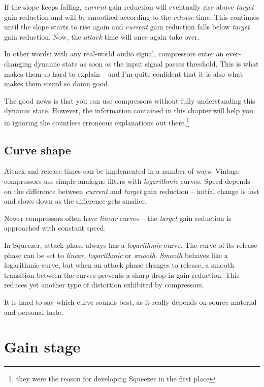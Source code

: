If the slope keeps falling, \emph{current} gain reduction will
eventually rise above \emph{target} gain reduction and will be
smoothed according to the \emph{release} time.  This continues until
the slope starts to rise again and \emph{current} gain reduction falls
below \emph{target} gain reduction.  Now, the \emph{attack} time will
once again take over.

In other words: with any real-world audio signal, compressors enter an
ever-changing dynamic state as soon as the input signal passes
threshold.  This is what makes them so hard to explain -- and I'm
quite confident that it is also what makes them sound so damn good.

The good news is that you can use compressors without fully
understanding this dynamic state.  However, the information contained
in this chapter will help you in ignoring the countless erroneous
explanations out there.\footnote{they were the reason for developing
  Squeezer in the first place}

\subsection{Curve shape}
\label{sec:curve_shape}

Attack and release times can be implemented in a number of ways.
Vintage compressors use simple analogue filters with
\emph{logarithmic} curves.  Speed depends on the difference between
\emph{current} and \emph{target} gain reduction -- initial change is
fast and slows down as the difference gets smaller.

Newer compressors often have \emph{linear} curves -- the \emph{target}
gain reduction is approached with constant speed.

In Squeezer, attack phase always has a \emph{logarithmic} curve.  The
curve of its release phase can be set to \emph{linear},
\emph{logarithmic} or \emph{smooth}.  \emph{Smooth} behaves like a
logarithmic curve, but when an attack phase changes to release, a
smooth transition between the curves prevents a sharp drop in gain
reduction.  This reduces yet another type of distortion exhibited by
compressors.

It is hard to say which curve sounds best, as it really depends on
source material and personal taste.

\section{Gain stage}
\label{sec:gain_stage}

